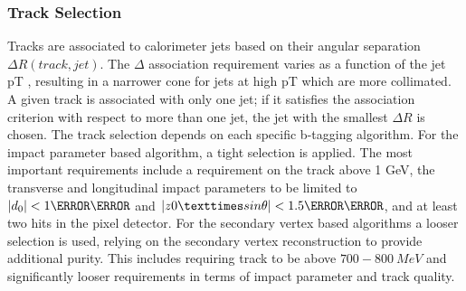 \subsubsection{Track Selection}
Tracks are associated to calorimeter jets based on their angular separation $\Delta R(track,jet)$. The $\Delta$ association requirement varies as a function of the jet pT , resulting in a narrower cone for jets at high pT which are more collimated. A given track is associated with only one jet; if it satisfies the association criterion with respect to more than one jet, the jet with the smallest $\Delta R$ is chosen.
The track selection depends on each specific b-tagging algorithm. For the impact parameter based algorithm, a tight selection is applied. The most important requirements include a requirement on the track \pt above 1 GeV, the transverse and longitudinal impact parameters to be limited to $|d_0| < 1 \milli\meter$ and $|z0 × sin\theta|<1.5\milli\meter$, and at least two hits in the pixel detector. For the secondary vertex based algorithms a looser selection is used, relying on the secondary vertex reconstruction to provide additional purity. This includes requiring track \pt to be above $700-800~MeV$ and significantly looser requirements in terms of impact parameter and track quality.
